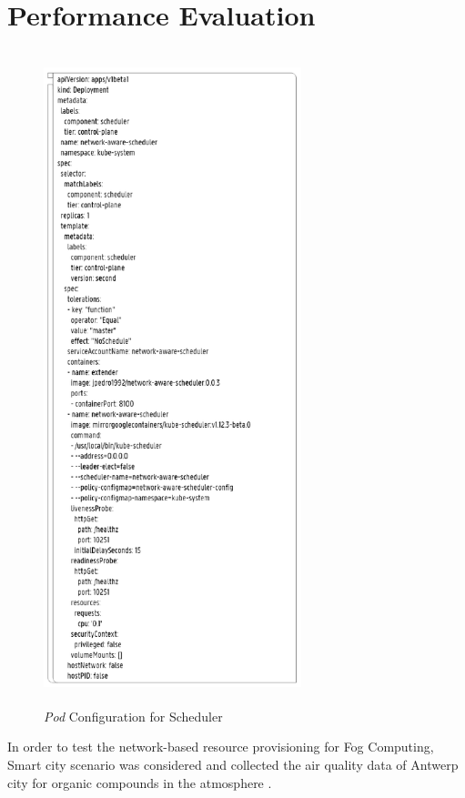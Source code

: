   \section{Performance Evaluation}
  \label{sec:Performance_eval}
  \begin{figure}
    \centering
    \includegraphics[width=75mm, height=19cm]{figures/mlcn-k8s-pod-config.pdf}
    \caption{\emph{Pod} Configuration for Scheduler\cite{Santos2019}}
    \label{fig:k8s-pod-config}
  \end{figure}
  In order to test the network-based resource provisioning for Fog Computing, Smart city scenario was considered and collected the air quality data of Antwerp city for organic compounds in the atmosphere \cite{Santos2019}.
  \vspace{-0.10cm}
